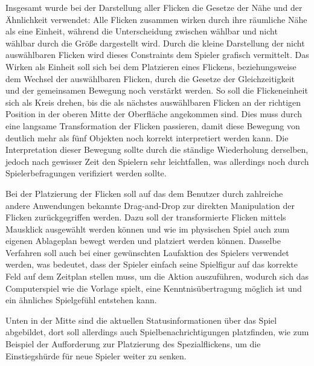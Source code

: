 Insgesamt wurde bei der Darstellung aller Flicken die Gesetze der Nähe und der Ähnlichkeit verwendet: Alle Flicken zusammen wirken durch ihre räumliche Nähe als eine Einheit, während die Unterscheidung zwischen wählbar und nicht wählbar durch die Größe dargestellt wird. Durch die kleine Darstellung der nicht auswählbaren Flicken wird dieses Constraints dem Spieler grafisch vermittelt. Das Wirken als Einheit soll sich bei dem Platzieren eines Flickens, beziehungsweise dem Wechsel der auswählbaren Flicken, durch die Gesetze der Gleichzeitigkeit und der gemeinsamen Bewegung noch verstärkt werden. So soll die Flickeneinheit sich als Kreis drehen, bis die als nächstes auswählbaren Flicken an der richtigen Position in der oberen Mitte der Oberfläche angekommen sind. Dies muss durch eine langsame Transformation der Flicken passieren, damit diese Bewegung von deutlich mehr als fünf Objekten noch korrekt interpretiert werden kann. Die Interpretation dieser Bewegung sollte durch die ständige Wiederholung derselben, jedoch nach gewisser Zeit den Spielern sehr leichtfallen, was allerdings noch durch Spielerbefragungen verifiziert werden sollte. 

Bei der Platzierung der Flicken soll auf das dem Benutzer durch zahlreiche andere Anwendungen bekannte Drag-and-Drop zur direkten Manipulation der Flicken zurückgegriffen werden. Dazu soll der transformierte Flicken mittels Mausklick ausgewählt werden können und wie im physischen Spiel auch zum eigenen Ablageplan bewegt werden und platziert werden können. Dasselbe Verfahren soll auch bei einer gewünschten Laufaktion des Spielers verwendet werden, was bedeutet, dass der Spieler einfach seine Spielfigur auf das korrekte Feld auf dem Zeitplan stellen muss, um die Aktion auszuführen, wodurch sich das Computerspiel wie die Vorlage spielt, eine Kenntnisübertragung möglich ist und ein ähnliches Spielgefühl entstehen kann. 

\pagebreak

Unten in der Mitte sind die aktuellen Statusinformationen über das Spiel abgebildet, dort soll allerdings auch Spielbenachrichtigungen platzfinden, wie zum Beispiel der Aufforderung zur Platzierung des Spezialflickens, um die Einstiegshürde für neue Spieler weiter zu senken.


